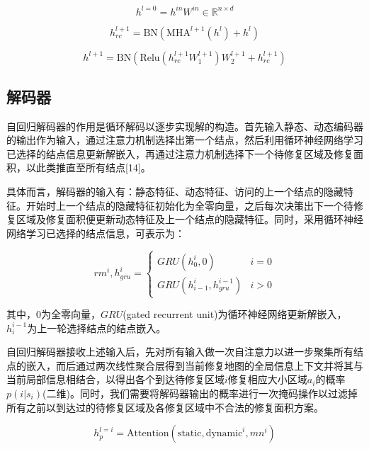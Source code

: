\documentclass[AutoFakeBold]{LZUThesis}
\begin{document}
\begin{equation}
	h^{l=0} = h^{in} W^{in} \in \mathbb{R}^{n \times d}
	\label{eq:13a}
\end{equation}

\begin{equation}
	h_{rc}^{l+1} = \text{BN}\left(\text{MHA}^{l+1}(h^l) + h^l\right)
	\label{eq:13b}
\end{equation}

\begin{equation}
	h^{l+1} = \text{BN}\left(\text{Relu}\left(h_{rc}^{l+1} W_1^{l+1}\right) W_2^{l+1} + h_{rc}^{l+1}\right)
	\label{eq:13c}
\end{equation}

\subsection{解码器}

自回归解码器的作用是循环解码以逐步实现解的构造。首先输入静态、动态编码器的输出作为输入，通过注意力机制选择出第一个结点，然后利用循环神经网络学习已选择的结点信息更新解嵌入，再通过注意力机制选择下一个待修复区域及修复面积，以此类推直至所有结点[14]。

具体而言，解码器的输入有：静态特征、动态特征、访问的上一个结点的隐藏特征。开始时上一个结点的隐藏特征初始化为全零向量，之后每次决策出下一个待修复区域及修复面积便更新动态特征及上一个结点的隐藏特征。同时，采用循环神经网络学习已选择的结点信息，可表示为：

\begin{equation}
	rm^{i}, h_{gru}^{i} =
	\left\{
	\begin{array}{ll}
		GRU(h_{0}^{i}, 0)               & i = 0 \\
		GRU(h_{i-1}^{i}, h_{gru}^{i-1}) & i > 0
	\end{array}
	\right.
	\label{eq:14}
\end{equation}

其中，$0$为全零向量，$GRU$(gated recurrent unit)为循环神经网络更新解嵌入，$h_i^{i-1}$为上一轮选择结点的结点嵌入。

自回归解码器接收上述输入后，先对所有输入做一次自注意力以进一步聚集所有结点的嵌入，而后通过两次线性聚合层得到当前修复地图的全局信息上下文并将其与当前局部信息相结合，以得出各个到达待修复区域$i$修复相应大小区域$a_i$的概率$p(i|s_i)$(二维)。同时，我们需要将解码器输出的概率进行一次掩码操作以过滤掉所有之前以到达过的待修复区域及各修复区域中不合法的修复面积方案。

\begin{equation}
	h_{p}^{l=i} = \text{Attention}(\text{static}, \text{dynamic}^{i}, mn^{i})
	\label{eq:15a}
\end{equation}
\end{document}
